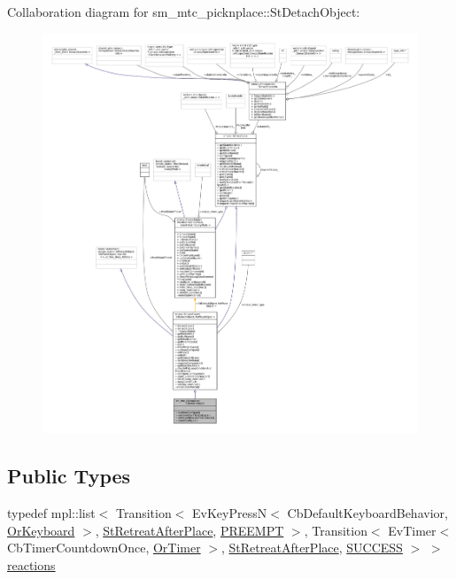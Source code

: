 Collaboration diagram for sm\+\_\+mtc\+\_\+picknplace\+:\+:St\+Detach\+Object\+:
\nopagebreak
\begin{figure}[H]
\begin{center}
\leavevmode
\includegraphics[width=350pt]{structsm__mtc__picknplace_1_1StDetachObject__coll__graph}
\end{center}
\end{figure}
\subsection*{Public Types}
\begin{DoxyCompactItemize}
\item 
typedef mpl\+::list$<$ Transition$<$ Ev\+Key\+PressN$<$ Cb\+Default\+Keyboard\+Behavior, \hyperlink{classsm__mtc__picknplace_1_1OrKeyboard}{Or\+Keyboard} $>$, \hyperlink{structsm__mtc__picknplace_1_1StRetreatAfterPlace}{St\+Retreat\+After\+Place}, \hyperlink{classPREEMPT}{P\+R\+E\+E\+M\+PT} $>$, Transition$<$ Ev\+Timer$<$ Cb\+Timer\+Countdown\+Once, \hyperlink{classsm__mtc__picknplace_1_1OrTimer}{Or\+Timer} $>$, \hyperlink{structsm__mtc__picknplace_1_1StRetreatAfterPlace}{St\+Retreat\+After\+Place}, \hyperlink{classSUCCESS}{S\+U\+C\+C\+E\+SS} $>$ $>$ \hyperlink{structsm__mtc__picknplace_1_1StDetachObject_a2d9f1674c4132c677c50092a19c67b1e}{reactions}
\end{DoxyCompactItemize}
